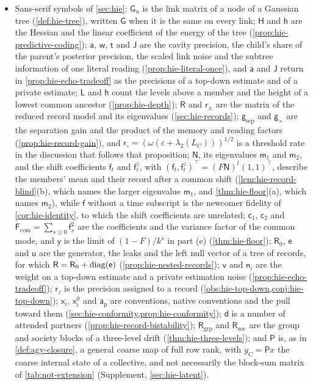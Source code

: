 \begin{itemize}
\item Sans-serif symbols of \cref{sec:hie}: $\mathsf G_u$ is the link matrix of a node of a Gaussian tree (\cref{def:hie-tree}), written $\mathsf G$ when it is the same on every link; $\mathsf H$ and $\mathsf h$ are the Hessian and the linear coefficient of the energy of the tree (\cref{prop:hie-predictive-coding}); $\mathsf a$, $\mathsf w$, $\mathsf t$ and $\mathsf J$ are the cavity precision, the child's share of the parent's posterior precision, the scaled link noise and the subtree information of one literal reading (\cref{prop:hie-literal-once}), and $\mathsf a$ and $\mathsf J$ return in \cref{prop:hie-echo-tradeoff} as the precisions of a top-down estimate and of a private estimate; $\mathsf L$ and $\mathsf h$ count the levels above a member and the height of a lowest common ancestor (\cref{prop:hie-depth}); $\mathsf R$ and $\mathsf r_\pm$ are the matrix of the reduced record model and its eigenvalues (\cref{sec:hie-records}); $\mathsf g_{\mathrm{sep}}$ and $\mathsf g_\times$ are the separation gain and the product of the memory and reading factors (\cref{prop:hie-record-gain}), and $\mathsf r_\circ=(\omega(\varepsilon+\lambda_2(L_C)))^{1/2}$ is a threshold rate in the discussion that follows that proposition; $\mathsf N$, its eigenvalues $\mathsf m_1$ and $\mathsf m_2$, and the shift coefficients $\mathsf f_t$ and $\mathsf f^z_t$, with $(\mathsf f_t,\mathsf f^z_t)^\top=(F\mathsf N)^t(1,1)^\top$, describe the members' mean and their record after a common shift (\cref{lem:hie-record-blind}(b), which names the larger eigenvalue $\mathsf m_1$, and \cref{thm:hie-floor}(a), which names $\mathsf m_2$), while $\mathsf f$ without a time subscript is the newcomer fidelity of \cref{cor:hie-identity}, to which the shift coefficients are unrelated; $\mathsf c_1$, $\mathsf c_2$ and $\mathsf F_{\mathrm{com}}=\sum_{s\ge0}\mathsf f_s^2$ are the coefficients and the variance factor of the common mode, and $\mathsf y$ is the limit of $(1-F)/k^s$ in part (e) (\cref{thm:hie-floor}); $\mathsf R_0$, $\mathsf e$ and $\mathsf u$ are the generator, the leaks and the left null vector of a tree of records, for which $\mathsf R=\mathsf R_0+\operatorname{diag}(\mathsf e)$ (\cref{prop:hie-nested-records}); $\mathsf v$ and $\mathsf n_i$ are the weight on a top-down estimate and a private estimation noise (\cref{prop:hie-echo-tradeoff}); $\mathsf r_z$ is the precision assigned to a record (\cref{obs:hie-top-down,conj:hie-top-down}); $\mathsf x_i$, $\mathsf x^0_i$ and $\mathsf a_{\mathrm p}$ are conventions, native conventions and the pull toward them (\cref{sec:hie-conformity,prop:hie-conformity}); $\mathsf d$ is a number of attended partners (\cref{prop:hie-record-bistability}); $\mathsf R_{\mathrm{grp}}$ and $\mathsf R_{\mathrm{soc}}$ are the group and society blocks of a three-level drift (\cref{thm:hie-three-levels}); and $\mathsf P$ is, as in \cref{def:agy-closure}, a general coarse map of full row rank, with $y_C=\mathsf Px$ the coarse internal state of a collective, and not necessarily the block-sum matrix of \cref{tab:not-extension} (Supplement, \cref{sec:hie-latent}).

\end{itemize}
